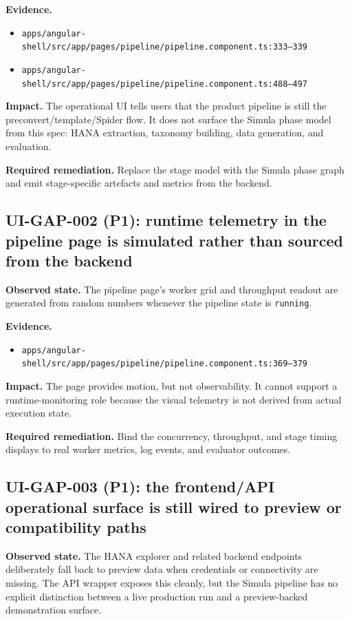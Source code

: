 \textbf{Evidence.}
\begin{itemize}
  \item \texttt{apps/angular-shell/src/app/pages/pipeline/pipeline.component.ts:333--339}
  \item \texttt{apps/angular-shell/src/app/pages/pipeline/pipeline.component.ts:488--497}
\end{itemize}

\textbf{Impact.}
The operational UI tells users that the product pipeline is still the
preconvert/template/Spider flow. It does not surface the Simula phase
model from this spec: HANA extraction, taxonomy building, data
generation, and evaluation.

\textbf{Required remediation.}
Replace the stage model with the Simula phase graph and emit
stage-specific artefacts and metrics from the backend.

\subsection*{UI-GAP-002 (P1): runtime telemetry in the pipeline page is simulated rather than sourced from the backend}
\textbf{Observed state.}
The pipeline page's worker grid and throughput readout are generated
from random numbers whenever the pipeline state is \texttt{running}.

\textbf{Evidence.}
\begin{itemize}
  \item \texttt{apps/angular-shell/src/app/pages/pipeline/pipeline.component.ts:369--379}
\end{itemize}

\textbf{Impact.}
The page provides motion, but not observability. It cannot support a
runtime-monitoring role because the visual telemetry is not derived
from actual execution state.

\textbf{Required remediation.}
Bind the concurrency, throughput, and stage timing displays to real
worker metrics, log events, and evaluator outcomes.

\subsection*{UI-GAP-003 (P1): the frontend/API operational surface is still wired to preview or compatibility paths}
\textbf{Observed state.}
The HANA explorer and related backend endpoints deliberately fall back
to preview data when credentials or connectivity are missing. The API
wrapper exposes this cleanly, but the Simula pipeline has no explicit
distinction between a live production run and a preview-backed
demonstration surface.


